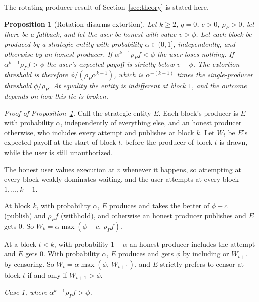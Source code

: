\documentclass[11pt]{article}
\newtheorem{proposition}{Proposition}
\newenvironment{steps}{\begin{list}{}{\setlength{\leftmargin}{3.6em}\setlength{\labelwidth}{3.2em}\setlength{\labelsep}{0.4em}\setlength{\itemsep}{2pt}\setlength{\topsep}{3pt}\setlength{\parsep}{0pt}\renewcommand{\makelabel}[1]{##1\hfil}}}{\end{list}}
\begin{document}
The rotating-producer result of Section~\ref{sec:theory} is stated here.

\begin{proposition}[Rotation disarms extortion]\label{prop:rot}
Let $k\ge2$, $q=0$, $c>0$, $\rho_P>0$, let there be a fallback, and let the user be honest with value $v>\phi$. Let each block be produced by a strategic entity with probability $\alpha\in(0,1]$, independently, and otherwise by an honest producer. If $\alpha^{k-1}\rho_P f<\phi$ the user loses nothing. If $\alpha^{k-1}\rho_P f>\phi$ the user's expected payoff is strictly below $v-\phi$. The extortion threshold is therefore $\phi/(\rho_P\alpha^{k-1})$, which is $\alpha^{-(k-1)}$ times the single-producer threshold $\phi/\rho_P$. At equality the entity is indifferent at block $1$, and the outcome depends on how this tie is broken.
\end{proposition}
\emph{Proof of Proposition~\ref{prop:rot}.} Call the strategic entity $E$. Each block's producer is $E$ with probability $\alpha$, independently of everything else, and an honest producer otherwise, who includes every attempt and publishes at block $k$. Let $W_t$ be $E$'s expected payoff at the start of block $t$, before the producer of block $t$ is drawn, while the user is still unauthorized.
\begin{steps}
\item[\emph{Step 1.}] The honest user values execution at $v$ whenever it happens, so attempting at every block weakly dominates waiting, and the user attempts at every block $1,\dots,k-1$.
\item[\emph{Step 2.}] At block $k$, with probability $\alpha$, $E$ produces and takes the better of $\phi-c$ (publish) and $\rho_P f$ (withhold), and otherwise an honest producer publishes and $E$ gets $0$. So $W_k=\alpha\max(\phi-c,\ \rho_P f)$.
\item[\emph{Step 3.}] At a block $t<k$, with probability $1-\alpha$ an honest producer includes the attempt and $E$ gets $0$. With probability $\alpha$, $E$ produces and gets $\phi$ by including or $W_{t+1}$ by censoring. So $W_t=\alpha\max(\phi,\ W_{t+1})$, and $E$ strictly prefers to censor at block $t$ if and only if $W_{t+1}>\phi$.
\end{steps}
\emph{Case 1, where $\alpha^{k-1}\rho_P f>\phi$.}
\end{document}
